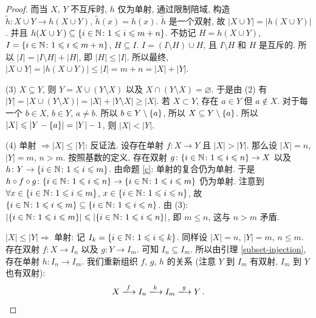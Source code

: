 \documentclass[UTF8]{ctexart}
\theoremstyle{mystyle}
\theoremstyle{myremark}
\theoremstyle{plain}
\newcommand{\N}{\mathbb N}
\DeclarePairedDelimiter\set{\{}{\}}
\begin{document}
\begin{proof}
    而当 $ X $, $ Y $ 不互斥时, $ h $ 仅为单射, 通过限制陪域, 构造 $ \widetilde{h} \colon X \cup Y \to h(X \cup Y) $, $ \widetilde{h} (x) = h(x) $. $ \widetilde{h} $ 是一个双射, 故 $ |X \cup Y| = |h(X \cup Y)| $. 并且 $ h(X \cup Y) \subseteq \set{i \in \N \colon 1 \leqslant i \leqslant m + n} $. 不妨记 $ H = h(X \cup Y) $, $ I = \set{i \in \N \colon 1 \leqslant i \leqslant m + n} $, $ H \subseteq I $. $ I = (I \setminus H) \cup H $, 且 $ I \setminus H $ 和 $ H $ 是互斥的. 所以 $ |I| = |I \setminus H| + |H| $, 即 $ |H| \leqslant |I| $. 所以最终, $ |X \cup Y| = |h(X \cup Y)| \leqslant |I| = m + n = |X| + |Y| $.

    (3) $ X \subseteq Y $, 则 $ Y = X \cup (Y \setminus X) $ 以及 $ X \cap (Y \setminus X) = \varnothing $. 于是由 (2) 有 $ |Y| = |X \cup (Y \setminus X)| = |X| + |Y \setminus X| \geqslant |X| $. 若 $ X \subset Y $, 存在 $ a \in Y $ 但 $ a \notin X $. 对于每一个 $ b \in X $, $ b \in Y $, $ a \neq b $. 所以 $ b \in Y \setminus \set{a} $, 所以 $ X \subseteq Y \setminus \set{a} $. 所以 $ |X| \leqslant |Y - \set{a}| = |Y| - 1 $, 则 $ |X| < |Y| $.

    (4) 单射 $ \Longrightarrow |X| \leqslant |Y| $: 反证法. 设存在单射 $ f \colon X \to Y $ 且 $ |X| > |Y| $. 那么设 $ |X| = n $, $ |Y| = m $, $ n > m $. 按照基数的定义, 存在双射 $ g \colon \set{i \in \N \colon 1 \leqslant i \leqslant n} \to X $ 以及 $ h \colon Y \to \set{i \in \N \colon 1 \leqslant i \leqslant m} $. 由命题 \ref{c}: 单射的复合仍为单射. 于是 $ h \circ f \circ g \colon \set{i \in \N \colon 1 \leqslant i \leqslant n} \to \set{i \in \N \colon 1 \leqslant i \leqslant m} $ 仍为单射. 注意到 $ \forall x \in \set{i \in \N \colon 1 \leqslant i \leqslant m} $, $ x \in \set{i \in \N \colon 1 \leqslant i \leqslant n} $, 故 $ \set{i \in \N \colon 1 \leqslant i \leqslant m} \subseteq \set{i \in \N \colon 1 \leqslant i \leqslant n} $. 由 (3): $ |\set{i \in \N \colon 1 \leqslant i \leqslant m}| \leqslant |\set{i \in \N \colon 1 \leqslant i \leqslant n}| $, 即 $ m \leqslant n $, 这与 $ n > m $ 矛盾.

    $ |X| \leqslant |Y| \Longrightarrow $ 单射: 记 $ I_{k} = \set{i \in \N \colon 1 \leqslant i \leqslant k} $. 同样设 $ |X| = n $, $ |Y| = m $, $ n \leqslant m $. 存在双射 $ f \colon X \to I_n $ 以及 $ g \colon Y \to I_m $. 可知 $ I_n \subseteq I_m $. 所以由引理 \ref{subset-injection}, 存在单射 $ h \colon I_n \to I_m $. 我们重新组织 $ f $, $ g $, $ h $ 的关系 (注意 $ Y $ 到 $ I_m $ 有双射, $ I_m $ 到 $ Y $ 也有双射): \[ X \xlongrightarrow{f} I_n \xlongrightarrow{h} I_m \xlongrightarrow{g} Y \,.\]


\end{proof}
\end{document}
